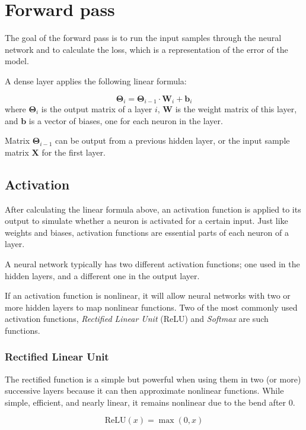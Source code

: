 \documentclass[a4paper]{article}
\newcommand{\matr}[1]{\mathbf{#1}}
\newcommand{\vect}[1]{\bm{#1}}
\begin{document}
\section*{Forward pass}
The goal of the forward pass is to run the input samples through the neural network and to calculate the loss, which is a representation of the error of the model.

A dense layer applies the following linear formula:

\begin{equation*}
    \matr{\Theta}_i = \matr{\Theta}_{i-1} \cdot \matr{W}_i + \bm{b}_i
\end{equation*}
where $\matr{\Theta}_i$ is the output matrix of a layer $i$, $\matr{W}$ is the weight matrix of this layer, and $\vect{b}$ is a vector of biases, one for each neuron in the layer.

Matrix $\matr{\Theta}_{i-1}$ can be output from a previous hidden layer, or the input sample matrix $\matr{X}$ for the first layer.

\subsection*{Activation}
After calculating the linear formula above, an activation function is applied to its output to simulate whether a neuron is activated for a certain input. Just like weights and biases, activation functions are essential parts of each neuron of a layer.

A neural network typically has two different activation functions; one used in the hidden layers, and a different one in the output layer.

If an activation function is nonlinear, it will allow neural networks with two or more hidden layers to map nonlinear functions. Two of the most commonly used activation functions, \emph{Rectified Linear Unit} (ReLU) and \emph{Softmax} are such functions.

\subsubsection*{Rectified Linear Unit}
The rectified function is a simple but powerful when using them in two (or more) successive layers because it can then approximate nonlinear functions. While simple, efficient, and nearly linear, it remains nonlinear due to the bend after 0.

\begin{equation*}
    \text{ReLU}(x) = \max(0, x)
\end{equation*}
\end{document}
